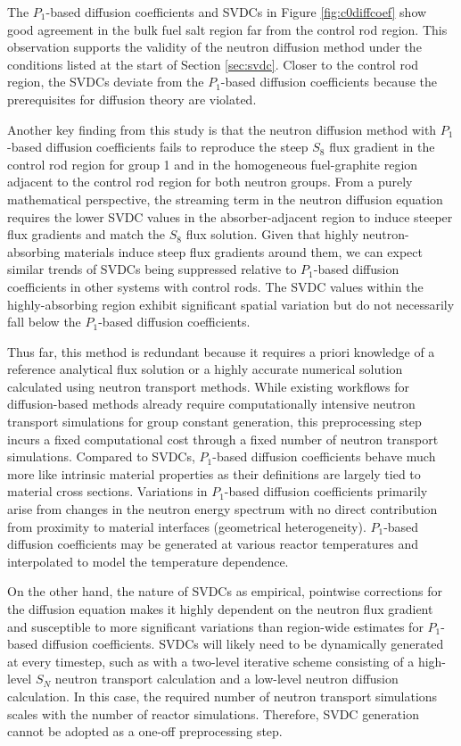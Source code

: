 The $P_1$-based diffusion coefficients and \glspl{SVDC} in Figure \ref{fig:c0diffcoef} show good
agreement in the bulk fuel salt region far from the control rod region.
This observation supports the validity of the neutron diffusion method under the conditions
listed at the start of Section \ref{sec:svdc}. Closer to the control rod
region, the \glspl{SVDC} deviate from the $P_1$-based diffusion coefficients because the
prerequisites for diffusion theory are violated.

Another key finding from this study is that the neutron diffusion method with $P_1$-based
diffusion coefficients fails to reproduce the steep $S_8$ flux gradient in the control rod region
for group 1 and in the homogeneous fuel-graphite region adjacent to the control rod region for both
neutron groups. From a purely mathematical perspective, the streaming term in the neutron
diffusion equation requires the lower
\gls{SVDC} values in the absorber-adjacent region to induce steeper flux gradients and match the
$S_8$ flux solution. Given that highly neutron-absorbing materials induce steep flux gradients
around them, we can expect similar trends of \glspl{SVDC} being suppressed relative to
$P_1$-based diffusion coefficients in other systems with control rods. The \gls{SVDC} values within
the highly-absorbing region exhibit significant spatial variation but do not necessarily fall
below the $P_1$-based diffusion coefficients.

Thus far, this method is redundant because it requires a priori knowledge of a reference
analytical flux solution or a highly accurate numerical solution calculated using neutron
transport methods. While existing workflows for diffusion-based methods already require
computationally intensive neutron transport simulations for group constant generation, this
preprocessing step incurs a fixed computational cost through
a fixed number of neutron transport simulations. Compared to \glspl{SVDC}, $P_1$-based diffusion
coefficients behave much more like intrinsic material properties as their definitions are largely
tied to material cross sections. Variations in $P_1$-based diffusion coefficients primarily arise
from changes in the neutron energy spectrum with no direct contribution from proximity to material
interfaces (geometrical heterogeneity). $P_1$-based diffusion coefficients may be generated at
various reactor temperatures and interpolated to model the temperature dependence.

On the other
hand, the nature of \glspl{SVDC} as empirical, pointwise corrections for the diffusion equation
makes it highly dependent on the neutron flux gradient and susceptible to more significant
variations than region-wide estimates for $P_1$-based diffusion coefficients. \glspl{SVDC} will
likely need to be dynamically generated at every timestep, such as with a two-level iterative
scheme consisting of a high-level $S_N$ neutron transport calculation and a low-level neutron
diffusion calculation. In this case, the required number of neutron transport simulations scales
with the number of reactor simulations. Therefore, \gls{SVDC} generation cannot be adopted as a
one-off preprocessing step.

